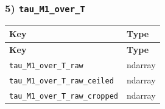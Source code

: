 \documentclass[11pt]{article}
\begin{document}
\subsubsection*{5) \texttt{tau\_\allowbreak{}M1\_\allowbreak{}over\_\allowbreak{}T}}
\begin{longtable}{|p{}|p{}|}
\hline
\textbf{Key} & \textbf{Type} \\ \hline
\endfirsthead
\hline
\textbf{Key} & \textbf{Type} \\ \hline
\endhead
\texttt{tau\_\allowbreak{}M1\_\allowbreak{}over\_\allowbreak{}T\_\allowbreak{}raw} & ndarray \\ \hline
\texttt{tau\_\allowbreak{}M1\_\allowbreak{}over\_\allowbreak{}T\_\allowbreak{}raw\_\allowbreak{}ceiled} & ndarray \\ \hline
\texttt{tau\_\allowbreak{}M1\_\allowbreak{}over\_\allowbreak{}T\_\allowbreak{}raw\_\allowbreak{}cropped} & ndarray \\ \hline
\end{longtable}
\end{document}
